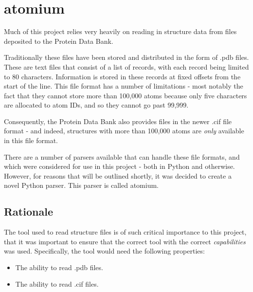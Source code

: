 



\chapter{atomium} %


Much of this project relies very heavily on reading in structure data from files deposited to the Protein Data Bank.

Traditionally these files have been stored and distributed in the form of .pdb files. These are text files that consist of a list of records, with each record being limited to 80 characters. Information is stored in these records at fixed offsets from the start of the line. This file format has a number of limitations - most notably the fact that they cannot store more than 100,000 atoms because only five characters are allocated to atom IDs, and so they cannot go past 99,999.

Consequently, the Protein Data Bank also provides files in the newer .cif file format - and indeed, structures with more than 100,000 atoms are \emph{only} available in this file format.

There are a number of parsers available that can handle these file formats, and which were considered for use in this project - both in Python and otherwise. However, for reasons that will be outlined shortly, it was decided to create a novel Python parser. This parser is called atomium.

\section{Rationale}

The tool used to read structure files is of such critical importance to this project, that it was important to ensure that the correct tool with the correct \emph{capabilities} was used. Specifically, the tool would need the following properties:

\begin{itemize}
  \item The ability to read .pdb files.
  \item The ability to read .cif files.
\end{itemize}

